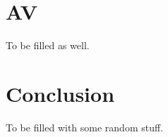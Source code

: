 \documentclass[14pt,twocolumn]{extarticle} %
\begin{document}
\section{AV}
\label{av}
To be filled as well.

\section{Conclusion}
\label{conclusion}
To be filled with some random stuff.

%

 
\end{document}
